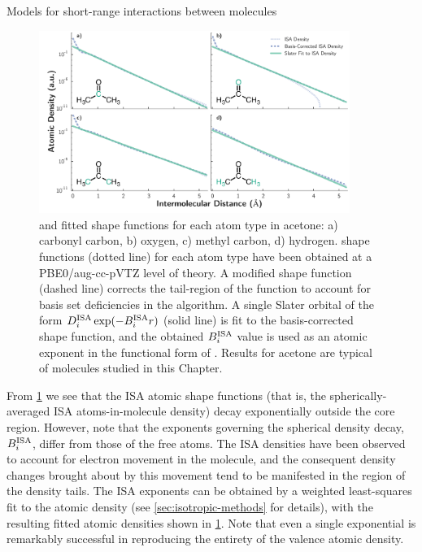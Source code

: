 \begin{subsection}{Models for short-range interactions between molecules}
    \begin{figure}
    \includegraphics[width=0.9\textwidth]{isotropic/acetone_isa.pdf}  
    \caption{
        \bsisa and fitted shape functions for each atom type in acetone: a) carbonyl carbon,
        b) oxygen, c) methyl carbon, d) hydrogen. \bsisa shape functions (dotted line)
        for each atom type have been obtained at a
        PBE0/aug-cc-pVTZ level of theory. A modified \bsisa shape
        function (dashed line) corrects the tail-region of the \bsisa function to
        account for basis set deficiencies in the \bsisa algorithm. A single Slater
        orbital of the form $D_i^{\text{ISA}}\exp(-B^{\text{ISA}}_{i} r)$ (solid line) is fit to the basis-corrected
        \bsisa shape function, and the obtained $B^{\text{ISA}}_{i}$ value is used as an atomic exponent
        in the functional form of \isaff. Results for acetone are typical of
        molecules studied in this Chapter.
    		   }
    \label{fig:isotropic-bsisa}
    \end{figure}

From \cref{fig:isotropic-bsisa} we see that the ISA atomic shape functions (that is, the
spherically-averaged ISA atoms-in-molecule density) 
decay exponentially outside the core region.
However, note that the exponents governing the spherical density decay, $B^{\text{ISA}}_{i}$, 
differ from those of the free atoms. The ISA densities have been observed to account
for electron movement in the molecule, and the consequent density changes
brought about by this movement tend to be manifested in the region of the 
density tails. \cite{Misquitta2014}
The ISA exponents can be obtained by a weighted least-squares fit to the \bsisa atomic density
(see \cref{sec:isotropic-methods} for details), with the resulting fitted
atomic densities shown in \cref{fig:isotropic-bsisa}. 
Note that even a single exponential is remarkably successful in reproducing the
entirety of the valence atomic density.


\end{subsection}
